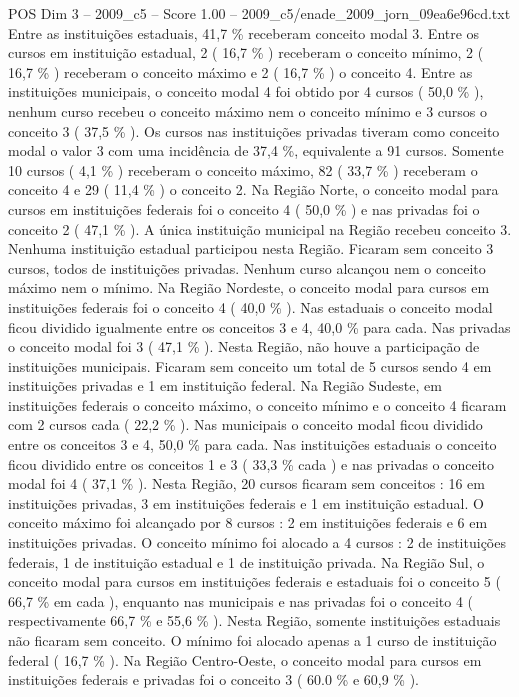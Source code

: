 \begin{textsample}{POS Dim 3 – 2009\_c5 – Score 1.00 – 2009\_c5/enade\_2009\_jorn\_09ea6e96cd.txt}
Entre as instituições estaduais, 41,7 \% receberam conceito modal 3.
Entre os cursos em instituição estadual, 2 ( 16,7 \% ) receberam o conceito mínimo, 2 ( 16,7 \% ) receberam o conceito máximo e 2 ( 16,7 \% ) o conceito 4.
Entre as instituições municipais, o conceito modal 4 foi obtido por 4 cursos ( 50,0 \% ), nenhum curso recebeu o conceito máximo nem o conceito mínimo e 3 cursos o conceito 3 ( 37,5 \% ).
Os cursos nas instituições privadas tiveram como conceito modal o valor 3 com uma incidência de 37,4 \%, equivalente a 91 cursos.
Somente 10 cursos ( 4,1 \% ) receberam o conceito máximo, 82 ( 33,7 \% ) receberam o conceito 4 e 29 ( 11,4 \% ) o conceito 2.
Na Região Norte, o conceito modal para cursos em instituições federais foi o conceito 4 ( 50,0 \% ) e nas privadas foi o conceito 2 ( 47,1 \% ).
A única instituição municipal na Região recebeu conceito 3.
Nenhuma instituição estadual participou nesta Região.
Ficaram sem conceito 3 cursos, todos de instituições privadas.
Nenhum curso alcançou nem o conceito máximo nem o mínimo.
Na Região Nordeste, o conceito modal para cursos em instituições federais foi o conceito 4 ( 40,0 \% ).
Nas estaduais o conceito modal ficou dividido igualmente entre os conceitos 3 e 4, 40,0 \% para cada.
Nas privadas o conceito modal foi 3 ( 47,1 \% ).
Nesta Região, não houve a participação de instituições municipais.
Ficaram sem conceito um total de 5 cursos sendo 4 em instituições privadas e 1 em instituição federal.
Na Região Sudeste, em instituições federais o conceito máximo, o conceito mínimo e o conceito 4 ficaram com 2 cursos cada ( 22,2 \% ).
Nas municipais o conceito modal ficou dividido entre os conceitos 3 e 4, 50,0 \% para cada.
Nas instituições estaduais o conceito ficou dividido entre os conceitos 1 e 3 ( 33,3 \% cada ) e nas privadas o conceito modal foi 4 ( 37,1 \% ).
Nesta Região, 20 cursos ficaram sem conceitos : 16 em instituições privadas, 3 em instituições federais e 1 em instituição estadual.
O conceito máximo foi alcançado por 8 cursos : 2 em instituições federais e 6 em instituições privadas.
O conceito mínimo foi alocado a 4 cursos : 2 de instituições federais, 1 de instituição estadual e 1 de instituição privada.
Na Região Sul, o conceito modal para cursos em instituições federais e estaduais foi o conceito 5 ( 66,7 \% em cada ), enquanto nas municipais e nas privadas foi o conceito 4 ( respectivamente 66,7 \% e 55,6 \% ).
Nesta Região, somente instituições estaduais não ficaram sem conceito.
O mínimo foi alocado apenas a 1 curso de instituição federal ( 16,7 \% ).
Na Região Centro-Oeste, o conceito modal para cursos em instituições federais e privadas foi o conceito 3 ( 60.0 \% e 60,9 \% ).

\end{textsample}
